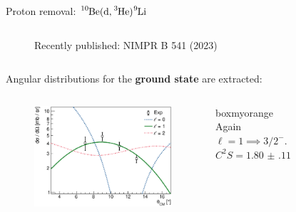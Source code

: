 \documentclass[sans,
frameno, %
mp,
usenames,dvipsnames, %
onlytextwidth, %
t,%
11pt]{beamer}
\newcommand{\iso}[2]{\ce{^{#1}#2}}
\begin{document}
\begin{frame}{Proton removal: $\iso{10}{Be}(\textrm{d}, \iso{3}{He})\iso{9}{Li}$}
{\begin{columns}[t]
{\begin{figure}
                    \caption{Recently published: NIMPR B 541 (2023)}
                \end{figure}
            }
        \end{columns}
    }
    {
        Angular distributions for the \textbf{ground state} are extracted:
        \begin{columns}[c]
            {
                \begin{figure}
                    \centering
                    \includegraphics[width=\linewidth, cfbox=myorange 1pt 0pt 0pt]{figures/Workshop/10Be_d3He_xs.eps}
                \end{figure}
                \medskip
                \hfill
                \begin{beamercolorbox}[sep=1ex,center, rounded=true, wd=0.95\linewidth]{boxmyorange}
                    Again $\ell = 1 \implies 3/2^{-}$. \\
                    $C^2S = \qty{1.80(11)}{}$
                \end{beamercolorbox}
                \hfill
            }
            \hfill
            {
                \vspace{10pt}
                \begin{figure}
                    \centering

\end{figure}}
\end{columns}}
\end{frame}
\end{document}

